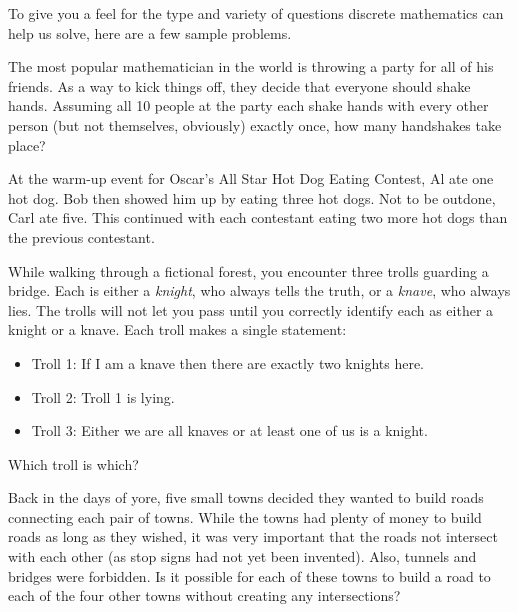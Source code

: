 \documentclass[11pt]{exam}
\begin{document}
To give you a feel for the type and variety of questions discrete mathematics can help us solve, here are a few sample problems.
\begin{questions}

\question The most popular mathematician in the world is throwing a party for all of his friends.  As a way to kick things off, they decide that everyone should shake hands.  Assuming all 10 people at the party each shake hands with every other person (but not themselves, obviously) exactly once, how many handshakes take place?

  \question At the warm-up event for Oscar's All Star Hot Dog Eating Contest, Al ate one hot dog.  Bob then showed him up by eating three hot dogs.  Not to be outdone, Carl ate five.  This continued with each contestant eating two more hot dogs than the previous contestant.

  \question While walking through a fictional forest, you encounter three trolls guarding a bridge.  Each is either a {\em knight}, who always tells the truth, or a {\em knave}, who always lies.  The trolls will not let you pass until you correctly identify each as either a knight or a knave.  Each troll makes a single statement:
  \begin{itemize}
   \item[] Troll 1: If I am a knave then there are exactly two knights here.
   \item[] Troll 2: Troll 1 is lying.
   \item[] Troll 3: Either we are all knaves or at least one of us is a knight.
  \end{itemize}
  Which troll is which?

  \question Back in the days of yore, five small towns decided they wanted to build roads connecting each pair of towns. While the towns had plenty of money to build roads as long as they wished, it was very important that the roads not intersect with each other (as stop signs had not yet been invented). Also, tunnels and bridges were forbidden. Is it possible for each of these towns to build a road to each of the four other towns without creating any intersections?






\end{questions}
\end{document}
